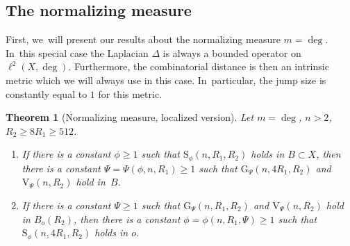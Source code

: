 \documentclass[10pt]{amsart}
\newenvironment{enumeratei}
{\bgroup\def\theenumi{\roman{enumi}}\def\theenumii{\arabic{enumii}}\begin{enumerate}}
{\end{enumerate}\egroup}
\newcommand{\rG}{\mathrm{G}}
\newcommand{\rS}{\mathrm{S}}
\newcommand{\rV}{\mathrm{V}}
\theoremstyle{plain}
\newtheorem{theorem}{Theorem}[section]
\theoremstyle{definition}
\begin{document}
\subsection*{The normalizing measure}
First, we~will present our results about the normalizing measure $m=\deg$. In~this special case the Laplacian $ \Delta $ is always a bounded operator on $ \ell^{2}(X,\deg) $. Furthermore, the combinatorial distance is then an intrinsic metric which we will always use in this case. In~particular, the jump size is constantly equal to $ 1 $ for this metric.
\begin{theorem}[Normalizing measure, localized version]\label{thm:equivnormalized}Let $ m=\deg $, {$n>2$}, $ R_2\geq 8 R_1\geq 512$.
\begin{enumeratei}
\item If there is a constant $\phi\geq 1$ such that $\rS_\phi (n,R_1,R_2)$ holds in $B\subset X$, then there {is a constant} $\Psi=\Psi(\phi,n,R_1)\geq 1$ such that $\rG_{\Psi}(n,4R_1,R_2)$ and $\rV_{{\Psi}}(n,R_2)$ hold in~$B$.
\item
If there {is a constant $\Psi\geq 1$} such that $\rG_{\Psi}(n,R_1,R_2)$ and $\rV_{{\Psi}}(n,R_2)$ hold in $B_o(R_2)$, then there is a constant $\phi=\phi(n,R_1,\Psi)\geq 1$ such that $\rS_{\phi}(n,4R_1,R_2)$ holds in $o$.
\end{enumeratei}
\end{theorem}
\end{document}
